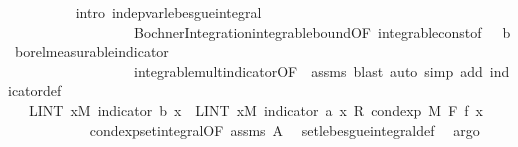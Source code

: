\begin{isabellebody}
\ \ \ \ \ \ \ \ \isamarkupfalse%
\ {\isacharparenleft}{\kern0pt}intro\ indep{\isacharunderscore}{\kern0pt}var{\isacharunderscore}{\kern0pt}lebesgue{\isacharunderscore}{\kern0pt}integral\isanewline
\ \ \ \ \ \ \ \ \ \ \ \ \ \ \ \ \ \ Bochner{\isacharunderscore}{\kern0pt}Integration{\isachardot}{\kern0pt}integrable{\isacharunderscore}{\kern0pt}bound{\isacharbrackleft}{\kern0pt}OF\ integrable{\isacharunderscore}{\kern0pt}const{\isacharbrackleft}{\kern0pt}of\ {\isachardoublequoteopen}{}\ {\isacharcolon}{\kern0pt}{\isacharcolon}{\kern0pt}\ {\isacharprime}{\kern0pt}b{\isachardoublequoteclose}{\isacharbrackright}{\kern0pt}\ borel{\isacharunderscore}{\kern0pt}measurable{\isacharunderscore}{\kern0pt}indicator{\isacharbrackright}{\kern0pt}\isanewline
\ \ \ \ \ \ \ \ \ \ \ \ \ \ \ \ \ \ integrable{\isacharunderscore}{\kern0pt}mult{\isacharunderscore}{\kern0pt}indicator{\isacharbrackleft}{\kern0pt}OF\ {\isacharunderscore}{\kern0pt}\ assms{\isacharparenleft}{\kern0pt}{}{\isacharparenright}{\kern0pt}{\isacharbrackright}{\kern0pt}{\isacharcomma}{\kern0pt}\ blast{\isacharparenright}{\kern0pt}\ {\isacharparenleft}{\kern0pt}auto\ simp\ add{\isacharcolon}{\kern0pt}\ indicator{\isacharunderscore}{\kern0pt}def{\isacharparenright}{\kern0pt}\isanewline
\ \ \ \ \ \ \ \ \isamarkupfalse%
\ \isamarkupfalse%
\ {\isachardoublequoteopen}{\isachardot}{\kern0pt}{\isachardot}{\kern0pt}{\isachardot}{\kern0pt}\ {\isacharequal}{\kern0pt}\ {\isacharparenleft}{\kern0pt}LINT\ x{\isacharbar}{\kern0pt}M{\isachardot}{\kern0pt}\ indicator\ b\ x{\isacharparenright}{\kern0pt}\ {\isacharasterisk}{\kern0pt}\ {\isacharparenleft}{\kern0pt}LINT\ x{\isacharbar}{\kern0pt}M{\isachardot}{\kern0pt}\ indicator\ a\ x\ {\isacharasterisk}{\kern0pt}\isactrlsub R\ cond{\isacharunderscore}{\kern0pt}exp\ M\ F\ f\ x{\isacharparenright}{\kern0pt}{\isachardoublequoteclose}\ \isanewline
\ \ \ \ \ \ \ \ \ \ \isamarkupfalse%
\ cond{\isacharunderscore}{\kern0pt}exp{\isacharunderscore}{\kern0pt}set{\isacharunderscore}{\kern0pt}integral{\isacharbrackleft}{\kern0pt}OF\ assms{\isacharparenleft}{\kern0pt}{}{\isacharparenright}{\kern0pt}\ A{\isacharparenleft}{\kern0pt}{}{\isacharparenright}{\kern0pt}{\isacharbrackright}{\kern0pt}\ \isamarkupfalse%
\ set{\isacharunderscore}{\kern0pt}lebesgue{\isacharunderscore}{\kern0pt}integral{\isacharunderscore}{\kern0pt}def\ \isamarkupfalse%
\ argo\isanewline
\ \ \ \ \ \ \ \ \isamarkupfalse%
\ \isamarkupfalse%

\end{isabellebody}
